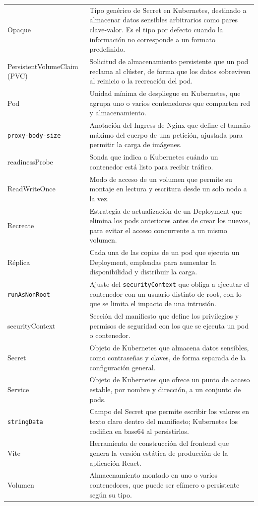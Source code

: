 \documentclass[stu,11pt,spanish,floatsintext]{apa7}
\begin{document}
\begin{longtable}{@{}p{}p{}@{}}
  Opaque & Tipo genérico de Secret en Kubernetes, destinado a almacenar datos sensibles arbitrarios como pares clave-valor. Es el tipo por defecto cuando la información no corresponde a un formato predefinido. \\
  PersistentVolumeClaim (PVC) & Solicitud de almacenamiento persistente que un pod reclama al clúster, de forma que los datos sobreviven al reinicio o la recreación del pod. \\
  Pod & Unidad mínima de despliegue en Kubernetes, que agrupa uno o varios contenedores que comparten red y almacenamiento. \\
  \texttt{proxy-body-size} & Anotación del Ingress de Nginx que define el tamaño máximo del cuerpo de una petición, ajustada para permitir la carga de imágenes. \\
  readinessProbe & Sonda que indica a Kubernetes cuándo un contenedor está listo para recibir tráfico. \\
  ReadWriteOnce & Modo de acceso de un volumen que permite su montaje en lectura y escritura desde un solo nodo a la vez. \\
  Recreate & Estrategia de actualización de un Deployment que elimina los pods anteriores antes de crear los nuevos, para evitar el acceso concurrente a un mismo volumen. \\
  Réplica & Cada una de las copias de un pod que ejecuta un Deployment, empleadas para aumentar la disponibilidad y distribuir la carga. \\
  \texttt{runAsNonRoot} & Ajuste del \texttt{securityContext} que obliga a ejecutar el contenedor con un usuario distinto de root, con lo que se limita el impacto de una intrusión. \\
  securityContext & Sección del manifiesto que define los privilegios y permisos de seguridad con los que se ejecuta un pod o contenedor. \\
  Secret & Objeto de Kubernetes que almacena datos sensibles, como contraseñas y claves, de forma separada de la configuración general. \\
  Service & Objeto de Kubernetes que ofrece un punto de acceso estable, por nombre y dirección, a un conjunto de pods. \\
  \texttt{stringData} & Campo del Secret que permite escribir los valores en texto claro dentro del manifiesto; Kubernetes los codifica en base64 al persistirlos. \\
  Vite & Herramienta de construcción del frontend que genera la versión estática de producción de la aplicación React. \\
  Volumen & Almacenamiento montado en uno o varios contenedores, que puede ser efímero o persistente según su tipo. \\
\end{longtable}
\end{document}
